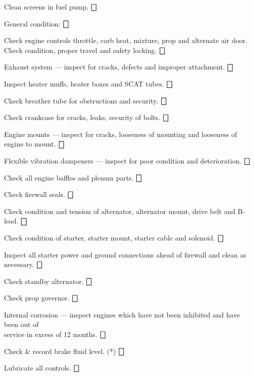 \begin{enumerate*}
\begin{enumerate*}
\begin{enumerate*}
		\end{enumerate*}
		\item Clean screens in fuel pump. \dotfill $\bigbox$
		\item General condition: \dotfill $\bigbox$
		\begin{enumerate*}
		\item Check engine controls throttle, carb heat, mixture, prop and alternate air door. Check condition, proper travel and safety locking. \dotfill $\bigbox$
		\item Exhaust system --- inspect for cracks, defects and improper attachment. \dotfill $\bigbox$
		\item Inspect heater muffs, heater boxes and SCAT tubes. \dotfill $\bigbox$
		\item Check breather tube for obstructions and security. \dotfill $\bigbox$
		\item Check crankcase for cracks, leaks, security of bolts. \dotfill $\bigbox$
		\item Engine mounts --- inspect for cracks, looseness of mounting and looseness of engine to mount. \dotfill $\bigbox$
		\item Flexible vibration dampeners --- inspect for poor condition and deterioration. \dotfill $\bigbox$
		\item Check all engine baffles and plenum parts. \dotfill $\bigbox$
		\item Check firewall seals. \dotfill $\bigbox$
		\item Check condition and tension of alternator, alternator mount, drive belt and B-lead. \dotfill $\bigbox$
		\item Check condition of starter, starter mount, starter cable and solenoid. \dotfill $\bigbox$
		\item Inspect all starter power and ground connections ahead of firewall and clean as necessary. \dotfill $\bigbox$
		\item Check standby alternator. \dotfill $\bigbox$
		\item Check prop governor. \dotfill $\bigbox$
		\item Internal corrosion --- inspect engines which have not been inhibited and have been out of \\service in excess of 12 months. \dotfill $\bigbox$
	  \end{enumerate*}
		\item Check \& record brake fluid level. (*) \dotfill $\bigbox$
		\item Lubricate all controls. \dotfill $\bigbox$

\end{enumerate*}
\end{enumerate*}
